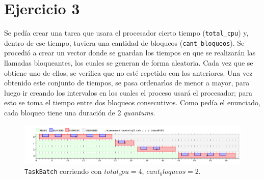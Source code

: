 \section{Ejercicio 3}
	Se pedía crear una tarea que usara el procesador cierto tiempo (\texttt{total_cpu}) y, dentro de ese tiempo, tuviera una cantidad de bloqueos (\texttt{cant_bloqueos}). Se procedió a crear un vector donde se guardan los tiempos en que se realizarán las llamadas bloqueantes, los cuales se generan de forma aleatoria. Cada vez que se obtiene uno de ellos, se verifica que no esté repetido con los anteriores. Una vez obtenido este conjunto de tiempos, se pasa ordenarlos de menor a mayor, para luego ir creando los intervalos en los cuales el proceso usará el procesador; para esto se toma el tiempo entre dos bloqueos consecutivos. Como pedía el enunciado, cada bloqueo tiene una duración de 2 \emph{quantums}.

	\begin{figure}[ht]
		\begin{center}
			\includegraphics[width=1\columnwidth]{imagenes/ej3.png}
			\caption{\texttt{TaskBatch} corriendo con $total_cpu = 4$, $cant_bloqueos = 2$.}
		\end{center}
	\end{figure}

